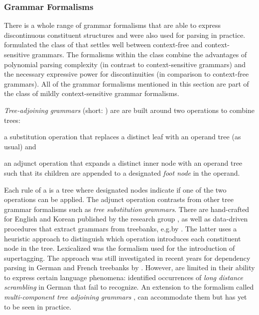 \documentclass[../document.tex]{subfiles}
\begin{document}
    \subsubsection*{Grammar Formalisms}
    There is a whole range of grammar formalisms that are able to express discontinuous constituent structures and were also used for parsing in practice.
    \citet{VijWeiJos87,Weir88} formulated the class of  that settles well between context-free and context-sensitive grammars.
    The formalisms within the class combine the advantages of polynomial parsing complexity (in contrast to context-sensitive grammars) and the necessary expressive power for discontinuities (in comparison to context-free grammars).
    All of the grammar formalisms mentioned in this section are part of the class of mildly context-sensitive grammar formalisms.

    \emph{Tree-adjoining grammars} (short: ) \citep{JosLevTak75} are are built around two operations to combine trees:
    \begin{compactitem}
        \item a substitution operation that replaces a distinct leaf with an operand tree (as usual) and
        \item an adjunct operation that expands a distinct inner node with an operand tree such that its children are appended to a designated \emph{foot node} in the operand.
    \end{compactitem}
    Each rule of a  is a tree where designated nodes indicate if one of the two operations can be applied.
    The adjunct operation contrasts  from other tree grammar formalisms such as \emph{tree substitution grammars}.
    There are hand-crafted  for English \citep{xtag01} and Korean \citep{xtag02} published by the  research group \citep{Anoop00}, as well as data-driven procedures that extract grammars from treebanks, e.g.\@ by \citet{xia1999extracting,Bla18}.
    The latter uses a heuristic approach to distinguish which operation introduces each constituent node in the tree.
    Lexicalized  was the formalism used for the introduction of supertagging. \citep{bangalore1999supertagging}
    The approach was still investigated in recent years for dependency parsing in German and French treebanks by \citet{Kas17,Bla18}.
    However,  are limited in their ability to express certain language phenomena: \citet{Becker91} identified occurrences of \emph{long distance scrambling} in German that  fail to recognize.
    An extension to the formalism called \emph{multi-component tree adjoining grammars} \citep{VijWeiJos87,Weir88}, can accommodate them but has yet to be seen in practice.
\end{document}
